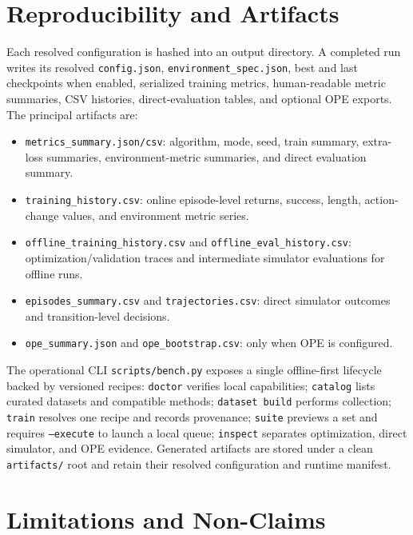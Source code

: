 \documentclass[10pt,twocolumn]{article}
\newcommand{\code}[1]{\texttt{#1}}
\begin{document}
\section{Reproducibility and Artifacts}
\label{sec:artifacts}

Each resolved configuration is hashed into an output directory. A completed run writes its resolved \code{config.json}, \code{environment\_spec.json}, best and last checkpoints when enabled, serialized training metrics, human-readable metric summaries, CSV histories, direct-evaluation tables, and optional OPE exports. The principal artifacts are:
\begin{itemize}
    \item \code{metrics\_summary.json/csv}: algorithm, mode, seed, train summary, extra-loss summaries, environment-metric summaries, and direct evaluation summary.
    \item \code{training\_history.csv}: online episode-level returns, success, length, action-change values, and environment metric series.
    \item \code{offline\_training\_history.csv} and \code{offline\_eval\_history.csv}: optimization/validation traces and intermediate simulator evaluations for offline runs.
    \item \code{episodes\_summary.csv} and \code{trajectories.csv}: direct simulator outcomes and transition-level decisions.
    \item \code{ope\_summary.json} and \code{ope\_bootstrap.csv}: only when OPE is configured.
\end{itemize}

The operational CLI \code{scripts/bench.py} exposes a single offline-first lifecycle backed by versioned recipes: \code{doctor} verifies local capabilities; \code{catalog} lists curated datasets and compatible methods; \code{dataset build} performs collection; \code{train} resolves one recipe and records provenance; \code{suite} previews a set and requires \code{--execute} to launch a local queue; \code{inspect} separates optimization, direct simulator, and OPE evidence. Generated artifacts are stored under a clean \code{artifacts/} root and retain their resolved configuration and runtime manifest.

\section{Limitations and Non-Claims}
\label{sec:limitations}
\end{document}
